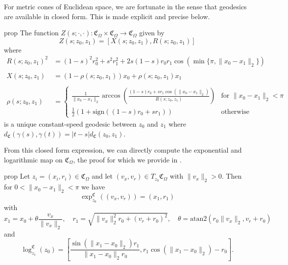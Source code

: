 \documentclass{article}
\begin{document}
For metric cones of Euclidean space, we are fortunate in the sense that geodesics are available in closed form. This is made explicit and precise below.

\begin{restatable}{prop}{}
    The function $Z(s; \cdot, \cdot ):\mathfrak{C}_\Omega \times \mathfrak{C}_\Omega \rightarrow \mathfrak{C}_\Omega$ given by 
    \begin{equation} \label{eq: cone geodesics}
        Z(s; z_0, z_1) = \left[X\left(s; z_0, z_1\right) , R\left(s; z_0, z_1\right)\right]
    \end{equation}
    where
    \begin{align*}
        R(s; z_0, z_1)^2 &= (1-s)^2r_0^2 + s^2r_1^2 + 2s(1-s)r_0r_1\cos(\min\{\pi, \|x_0 - x_1\|_2\}) \\
        \\[0.25ex]X(s; z_0, z_1) &= (1 - \rho(s; z_0, z_1))x_0 + \rho(s; z_0, z_1)x_1 \\
        \\[0.05ex]\rho(s; z_0, z_1) &= \begin{cases}
            \frac{1}{\|x_0 - x_1\|_2}\arccos\left(\frac{(1-s)r_0 + sr_1\cos(\|x_0 - x_1\|_2)}{R(s; z_0, z_1)}\right) & \text{for }\|x_0 - x_1\|_2 < \pi \\
            \frac{1}{2}\left(1 + \text{sign}((1-s)r_0 + sr_1)\right) & \text{otherwise}
        \end{cases}
    \end{align*}
    is a unique constant-speed geodesic between $z_0$ and $z_1$ where $d_{\mathfrak{C}}(\gamma(s), \gamma(t)) = |t-s|d_{\mathfrak{C}}(z_0, z_1)$. 
\end{restatable}

From this closed form expression, we can directly compute the exponential and logarithmic map on $\mathfrak{C}_\Omega$, the proof for which we provide in .
\begin{restatable}{prop}{} \label{cone exponential and log map}
    Let $z_i = (x_i, r_i) \in \mathfrak{C}_{\Omega}$ and let $(v_x, v_r) \in T_{z_0}\mathfrak{C}_\Omega$ with $\|v_x\|_2 > 0$. Then for $0 < \|x_0 - x_1\|_2 < \pi$ we have
    \begin{equation} \label{eq: cone exp map}
        \exp^{\mathfrak{C}}_{z_0}((v_x, v_r)) = \left(x_1, r_1\right)
    \end{equation}
    with 
    \begin{equation*}
        x_1 = x_0 + \theta\frac{v_x}{\|v_x\|_2}, \quad r_1 = \sqrt{\|v_x\|_2^2r_0 + (v_r+r_0)^2}, \quad \theta = \text{atan2}(r_0\|v_x\|_2, v_r + r_0)
    \end{equation*}
    and 
    \begin{equation} \label{eq: cone log map}
        \log_{z_1}^\mathfrak{C}(z_0) = \left[\frac{\sin(\|x_1 - x_0\|_2)r_1}{\|x_1 - x_0\|_2r_0}, r_1\cos(\|x_1 - x_0\|_2) - r_0\right].
    \end{equation}
\end{restatable} 
\end{document}

